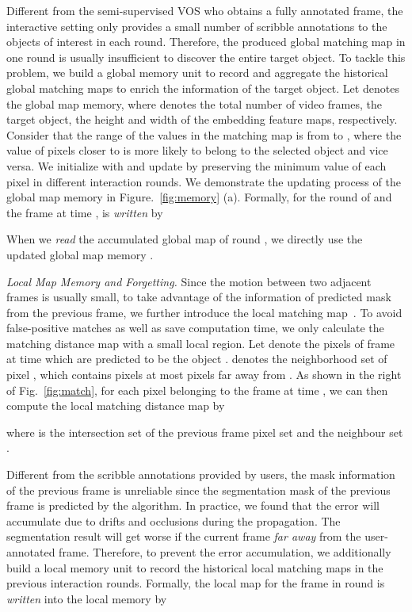 \documentclass[10pt,twocolumn,letterpaper]{article}
\begin{document}
Different from the semi-supervised VOS who obtains a fully annotated frame, the interactive setting only provides a small number of scribble annotations to the objects of interest in each round. 
Therefore, the produced global matching map in one round is usually insufficient to discover the entire target object. To tackle this problem, we build a global memory unit to record and aggregate the historical global matching maps to enrich the information of the target object. Let  denotes the global map memory, where  denotes the total number of video frames, the target object, the height and width of the embedding feature maps, respectively. Consider that the range of the values in the matching map is from  to , where the value of pixels closer to  is more likely to belong to the selected object and vice versa. We initialize  with  and update  by preserving the minimum value of each pixel in different interaction rounds. We demonstrate the updating process of the global map memory in Figure.~\ref{fig:memory} (a). Formally, for the round of  and the frame at time ,  is \emph{written} by

When we \emph{read} the accumulated global map of round , we directly use the updated global map memory .

\emph{Local Map Memory and Forgetting.}
Since the motion between two adjacent frames is usually small, to take advantage of the information of predicted mask from the previous frame, we further introduce the local matching map~\cite{voigtlaender2019feelvos}.
To avoid false-positive matches as well as save computation time, we only calculate the matching distance map with a small local region. Let  denote the pixels of frame at time  which are predicted to be the object .  denotes the neighborhood set of pixel , which contains pixels at most  pixels far away from . As shown in the right of Fig.~\ref{fig:match}, for each pixel  belonging to the frame at time , we can then compute the local matching distance map  by

where  is the intersection set of the previous frame pixel set  and the neighbour set .


Different from the scribble annotations provided by users, the mask information of the previous frame is unreliable since the segmentation mask of the previous frame is predicted by the algorithm. In practice, we found that the error will accumulate due to drifts and occlusions during the propagation. The segmentation result will get worse if the current frame \emph{far away} from the user-annotated frame. Therefore, to prevent the error accumulation, we additionally build a local memory unit  to record the historical local matching maps in the previous interaction rounds. Formally, the local map  for the  frame in round  is \emph{written} into the local memory by
\end{document}
